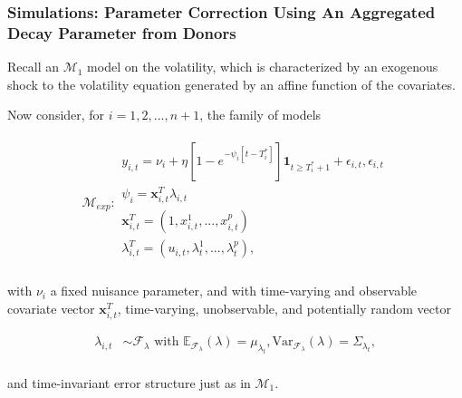 \documentclass[9pt]{beamer}
\newcommand{\x}{\textbf{x}}
\def\mrm#1{\mathrm{#1}} %
\def\mc#1{\mathcal{#1}} %
\def\E{\mathbb{E}} %
\def\mc#1{\mathcal{#1}}
\theoremstyle{definition}
\begin{document}
\begin{frame}
    \fontsize{8pt}{9pt}
    
    \frametitle{Simulations: Parameter Correction Using An Aggregated Decay Parameter from Donors}
    
        
    Recall an \hyperlink{model_1}{$\mc{M}_1$} model on the volatility, which is characterized by an exogenous shock to the volatility equation generated by an affine function of the covariates.

    \bigskip

    Now consider, for $i=1,2,...,n+1$, the family of models
    
    \begin{align}
        \mc{M}_{exp} \colon 
    \begin{array}{l}
        y_{i,t} = \nu_{i} + \eta[1 - e^{-\psi_{i}[t-T_{i}^{*}]}]\textbf{1}_{t\geq T_{i}^{*}+1} + \epsilon_{i,t}, \epsilon_{i,t} \\[.2cm]  
          \psi_{i} = \x^{T}_{i,t}\lambda_{i,t} \\[.2cm]
         \x_{i,t}^{T} = (1,x^{1}_{i,t},...,x^{p}_{i,t})\\[.2cm] 
         \lambda_{i,t}^{T} = (u_{i,t},\lambda^{1}_{t},...,\lambda^{p}_{t}),\\[.2cm]
        \end{array}
    \end{align}

    with $\nu_{i}$ a fixed nuisance parameter, and with time-varying and observable covariate vector $\x_{i,t}^{T}$, time-varying, unobservable, and potentially random vector
    
    \begin{align*}
    \lambda_{i,t} &\sim \mc{F}_{\lambda}\text{ with }  \E_{\mathcal{F}_{\lambda}}(\lambda) = \mu_{\lambda_{t}}, \mrm{Var}_{\mc{F}_{\lambda}}(\lambda) = \Sigma_{\lambda_{t}},\\
    \end{align*}

    and time-invariant error structure just as in $\mc{M}_{1}$.


    \end{frame}
\end{document}
